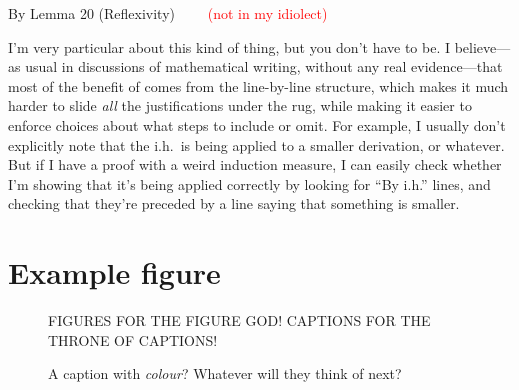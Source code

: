 \documentclass{purple}
\begin{document}
\begin{llproof}
  \substextendPf{\Gamma}{\Gamma}  {By Lemma 20 (Reflexivity)}
  \substextendPf{\Delta}{\Delta}  {\ditto~~~~\textcolor{red}{(not in my idiolect)}}
\end{llproof}

I'm very particular about this kind of thing, but you don't have to be.  I
believe---as usual in discussions of mathematical writing, without any real
evidence---that most of the benefit of  comes from the line-by-line
structure, which makes it much harder to slide \emph{all} the justifications under
the rug, while making it easier to enforce choices about what steps to include or
omit.  For example, I usually don't explicitly note that the i.h.\ is being applied to a
smaller derivation, or whatever.  But if I have
a proof with a weird induction measure, I can easily check whether I'm showing that
it's being applied correctly by looking for ``By i.h.'' lines, and checking that they're preceded by a line saying that something is smaller.


\section{Example figure}

\begin{figure}[htbp]
  \centering
  
  FIGURES FOR THE FIGURE GOD!  CAPTIONS FOR THE THRONE OF CAPTIONS!

  \caption{A caption with \emph{colour}?  Whatever will they think of next?}
  \label{fig:example}
\end{figure}
\end{document}

